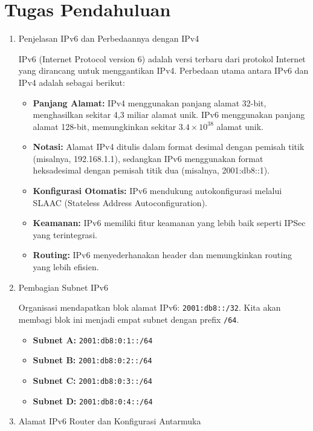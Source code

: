 \section{Tugas Pendahuluan}
\begin{enumerate}
    \item {Penjelasan IPv6 dan Perbedaannya dengan IPv4}

IPv6 (Internet Protocol version 6) adalah versi terbaru dari protokol Internet yang dirancang untuk menggantikan IPv4. Perbedaan utama antara IPv6 dan IPv4 adalah sebagai berikut:

\begin{itemize}
    \item \textbf{Panjang Alamat:} IPv4 menggunakan panjang alamat 32-bit, menghasilkan sekitar 4,3 miliar alamat unik. IPv6 menggunakan panjang alamat 128-bit, memungkinkan sekitar $3.4 \times 10^{38}$ alamat unik.
    \item \textbf{Notasi:} Alamat IPv4 ditulis dalam format desimal dengan pemisah titik (misalnya, 192.168.1.1), sedangkan IPv6 menggunakan format heksadesimal dengan pemisah titik dua (misalnya, 2001:db8::1).
    \item \textbf{Konfigurasi Otomatis:} IPv6 mendukung autokonfigurasi melalui SLAAC (Stateless Address Autoconfiguration).
    \item \textbf{Keamanan:} IPv6 memiliki fitur keamanan yang lebih baik seperti IPSec yang terintegrasi.
    \item \textbf{Routing:} IPv6 menyederhanakan header dan memungkinkan routing yang lebih efisien.
\end{itemize}

    \item {Pembagian Subnet IPv6}

Organisasi mendapatkan blok alamat IPv6: \texttt{2001:db8::/32}. Kita akan membagi blok ini menjadi empat subnet dengan prefix \texttt{/64}.

\begin{itemize}
    \item \textbf{Subnet A:} \texttt{2001:db8:0:1::/64}
    \item \textbf{Subnet B:} \texttt{2001:db8:0:2::/64}
    \item \textbf{Subnet C:} \texttt{2001:db8:0:3::/64}
    \item \textbf{Subnet D:} \texttt{2001:db8:0:4::/64}
\end{itemize}

    \item {Alamat IPv6 Router dan Konfigurasi Antarmuka}


\end{enumerate}
